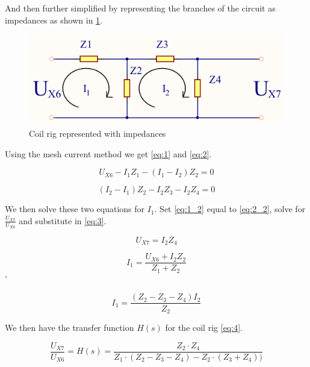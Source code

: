 And then further simplified by representing the branches of the circuit as impedances as shown in \cref{fig:spolerigg3}.

\begin{figure}[H]
    \centering
    \includegraphics[width=\textwidth]{Skjema/Spolerigg3_r.pdf}
    \caption{Coil rig represented with impedances}
    \label{fig:spolerigg3}
\end{figure}

Using the mesh current method we get \cref{eq:1} and \cref{eq:2}.

\begin{equation} \label{eq:1}
    U_{X6} - I_1 Z_1 - (I_1 - I_2) Z_2 = 0
\end{equation}

\begin{equation} \label{eq:2}
    (I_2 - I_1) Z_2 - I_2 Z_3 - I_2 Z_4 = 0
\end{equation}

We then solve these two equations for $I_1$. Set \cref{eq:1_2} equal to \cref{eq:2_2}, solve for $\frac{U_{X7}}{U_{X6}}$ and substitute in \cref{eq:3}.

\begin{equation} \label{eq:3}
    U_{X7} = I_2 Z_4
\end{equation}

\begin{equation} \label{eq:1_2}
    I_1 = \frac{U_{X6} + I_2 Z_2}{Z_1 + Z_2}
\end{equation}'

\begin{equation} \label{eq:2_2}
    I_1 = \frac{(Z_2 - Z_3 - Z_4) I_2}{Z_2}
\end{equation}

We then have the transfer function $H(s)$ for the coil rig \cref{eq:4}.

\begin{equation} \label{eq:4}
    \frac{U_{X7}}{U_{X6}} = H(s) = \frac{Z_2 \cdot Z_4}{Z_1 \cdot (Z_2 - Z_3 - Z_4) - Z_2 \cdot (Z_3 + Z_4))}
\end{equation}


